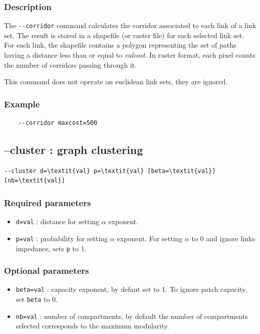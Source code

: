 \documentclass[a4paper,10pt]{report}
\begin{document}
\subsubsection{Description}
The \verb|--corridor| command calculates the corridor associated to each link of a link set.
The result is stored in a shapefile (or raster file) for each selected link set.
For each link, the shapefile contains a polygon representing the set of paths having a distance less than or equal to \textit{valcost}. In raster format, each pixel counts the number of corridors passing through it.

This command does not operate on euclidean link sets, they are ignored.

\subsubsection{Example}
\begin{Verbatim}
	--corridor maxcost=500
\end{Verbatim}

\subsection{--cluster : graph clustering}
\begin{Verbatim}[commandchars=\\\{\}]
--cluster d=\textit{val} p=\textit{val} [beta=\textit{val}] [nb=\textit{val}]
\end{Verbatim}

\subsubsection{Required parameters}
\begin{itemize}
	\item \verb|d=val| : distance for setting $\alpha$ exponent.
	\item \verb|p=val| : probability for setting $\alpha$ exponent. For setting $\alpha$ to 0 and ignore links impedance, sets \verb|p| to 1.
\end{itemize}

\subsubsection{Optional parameters}
\begin{itemize}
	\item \verb|beta=val| : capacity exponent, by defaut set to 1. To ignore patch capacity, set \verb|beta| to 0.
	\item \verb|nb=val| : number of compartments, by default the number of compartments selected corresponds to the maximum modularity.
\end{itemize}
\end{document}
